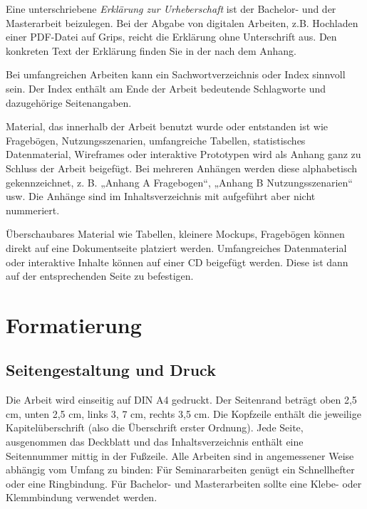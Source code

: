 
Eine unterschriebene \emph{Erklärung zur Urheberschaft} ist der Bachelor- und der Masterarbeit beizulegen. Bei der Abgabe von digitalen Arbeiten, z.B. Hochladen einer PDF-Datei auf Grips, reicht die Erklärung ohne Unterschrift aus. Den konkreten Text der Erklärung finden Sie in der nach dem Anhang.


Bei umfangreichen Arbeiten kann ein Sachwortverzeichnis oder Index sinnvoll sein. Der Index enthält am Ende der Arbeit bedeutende Schlagworte und dazugehörige Seitenangaben.


Material, das innerhalb der Arbeit benutzt wurde oder entstanden ist wie Fragebögen, Nutzungsszenarien, umfangreiche Tabellen, statistisches Datenmaterial, Wireframes oder interaktive Prototypen wird als Anhang ganz zu Schluss der Arbeit beigefügt. Bei mehreren Anhängen werden diese alphabetisch gekennzeichnet, z. B. „Anhang A Fragebogen“, „Anhang B Nutzungsszenarien“ usw. Die Anhänge sind im Inhaltsverzeichnis mit aufgeführt aber nicht nummeriert.

Überschaubares Material wie Tabellen, kleinere Mockups, Fragebögen können direkt auf eine Dokumentseite platziert werden. Umfangreiches Datenmaterial oder interaktive Inhalte können auf einer CD beigefügt werden. Diese ist dann auf der entsprechenden Seite zu befestigen. 

\section{Formatierung}\label{subsec:formatierung}

\subsection{Seitengestaltung und Druck}\label{subsubsec:seitengestaltung}

Die Arbeit wird einseitig auf DIN A4 gedruckt. Der Seitenrand beträgt oben 2,5 cm, unten 2,5 cm, links 3, 7 cm, rechts 3,5 cm. Die Kopfzeile enthält die jeweilige Kapitelüberschrift (also die Überschrift erster Ordnung). Jede Seite, ausgenommen das Deckblatt und das Inhaltsverzeichnis enthält eine Seitennummer mittig in der Fußzeile. Alle Arbeiten sind in angemessener Weise abhängig vom Umfang zu binden: Für Seminararbeiten genügt ein Schnellhefter oder eine Ringbindung. Für Bachelor- und Masterarbeiten sollte eine Klebe- oder Klemmbindung verwendet werden.

